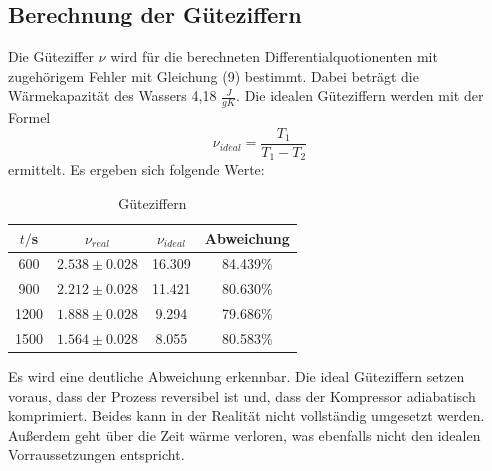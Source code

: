 \subsection{Berechnung der Güteziffern}
Die Güteziffer $\nu$ wird für die berechneten Differentialquotionenten mit zugehörigem Fehler mit Gleichung (9) bestimmt.
Dabei beträgt die Wärmekapazität des Wassers 4,18 $\frac{J}{gK}$. \cite{sample1}
Die idealen Güteziffern werden mit der Formel
\begin{equation}
  \nu_{ideal} = \frac{T_1}{T_1-T_2}
\end{equation}
ermittelt. Es ergeben sich folgende Werte:
\begin{table}
  \centering
  \caption{Güteziffern}
  \label{tab:Reale und ideale Güteziffern}
  \begin{tabular}{c c c c}
    \toprule
    $t/$s & $\nu_{real}$ & $\nu_{ideal}$ & Abweichung \\
    \midrule
     600 & $2.538 \pm 0.028$ &   16.309 &  84.439\% \\
     900 & $2.212 \pm 0.028$ &   11.421 &  80.630\% \\
    1200 & $1.888 \pm 0.028$ &    9.294 &  79.686\% \\
    1500 & $1.564 \pm 0.028$ &    8.055 &  80.583\% \\
    \bottomrule
  \end{tabular}
\end{table}

Es wird eine deutliche Abweichung erkennbar. Die ideal Güteziffern setzen
voraus, dass der Prozess reversibel ist und, dass der Kompressor adiabatisch
komprimiert. Beides kann in der Realität nicht vollständig umgesetzt werden. Außerdem
geht über die Zeit wärme verloren, was ebenfalls nicht den idealen Vorraussetzungen entspricht.
